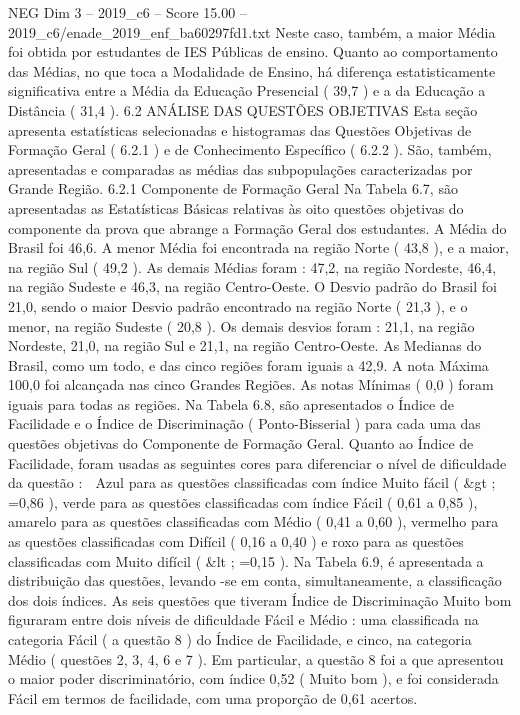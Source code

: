 \begin{textsample}{NEG Dim 3 – 2019\_c6 – Score 15.00 – 2019\_c6/enade\_2019\_enf\_ba60297fd1.txt}
Neste caso, também, a maior Média foi obtida por estudantes de IES Públicas de ensino.
Quanto ao comportamento das Médias, no que toca a Modalidade de Ensino, há diferença estatisticamente significativa entre a Média da Educação Presencial ( 39,7 ) e a da Educação a Distância ( 31,4 ). 6.2 ANÁLISE DAS QUESTÕES OBJETIVAS Esta seção apresenta estatísticas selecionadas e histogramas das Questões Objetivas de Formação Geral ( 6.2.1 ) e de Conhecimento Específico ( 6.2.2 ).
São, também, apresentadas e comparadas as médias das subpopulações caracterizadas por Grande Região. 6.2.1 Componente de Formação Geral Na Tabela 6.7, são apresentadas as Estatísticas Básicas relativas às oito questões objetivas do componente da prova que abrange a Formação Geral dos estudantes.
A Média do Brasil foi 46,6.
A menor Média foi encontrada na região Norte ( 43,8 ), e a maior, na região Sul ( 49,2 ).
As demais Médias foram : 47,2, na região Nordeste, 46,4, na região Sudeste e 46,3, na região Centro-Oeste.
O Desvio padrão do Brasil foi 21,0, sendo o maior Desvio padrão encontrado na região Norte ( 21,3 ), e o menor, na região Sudeste ( 20,8 ).
Os demais desvios foram : 21,1, na região Nordeste, 21,0, na região Sul e 21,1, na região Centro-Oeste.
As Medianas do Brasil, como um todo, e das cinco regiões foram iguais a 42,9.
A nota Máxima 100,0 foi alcançada nas cinco Grandes Regiões.
As notas Mínimas ( 0,0 ) foram iguais para todas as regiões.
Na Tabela 6.8, são apresentados o Índice de Facilidade e o Índice de Discriminação ( Ponto-Bisserial ) para cada uma das questões objetivas do Componente de Formação Geral.
Quanto ao Índice de Facilidade, foram usadas as seguintes cores para diferenciar o nível de dificuldade da questão :  Azul para as questões classificadas com índice Muito fácil ( \&gt ; =0,86 ), verde para as questões classificadas com índice Fácil ( 0,61 a 0,85 ), amarelo para as questões classificadas com Médio ( 0,41 a 0,60 ), vermelho para as questões classificadas com Difícil ( 0,16 a 0,40 ) e roxo para as questões classificadas com Muito difícil ( \&lt ; =0,15 ).
Na Tabela 6.9, é apresentada a distribuição das questões, levando -se em conta, simultaneamente, a classificação dos dois índices.
As seis questões que tiveram Índice de Discriminação Muito bom figuraram entre dois níveis de dificuldade Fácil e Médio : uma classificada na categoria Fácil ( a questão 8 ) do Índice de Facilidade, e cinco, na categoria Médio ( questões 2, 3, 4, 6 e 7 ).
Em particular, a questão 8 foi a que apresentou o maior poder discriminatório, com índice 0,52 ( Muito bom ), e foi considerada Fácil em termos de facilidade, com uma proporção de 0,61 acertos.

\end{textsample}
